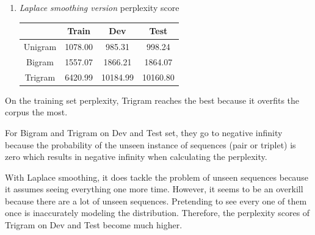 \documentclass{article}
\newenvironment{solution}{\color{blue}}{}
\begin{document}
\begin{enumerate}[(a)]
\begin{solution}
\begin{enumerate}[1.]
      \item \textit{Laplace smoothing version} perplexity score
      \begin{center}
        \begin{tabular}{| c | c | c | c |}
          \hline
          & Train & Dev & Test \\ \hline
          Unigram & 1078.00 & 985.31 & 998.24 \\ \hline
          Bigram & 1557.07 & 1866.21 & 1864.07 \\ \hline
          Trigram & 6420.99 & 10184.99 & 10160.80 \\ \hline
        \end{tabular}
      \end{center}
    \end{enumerate}

    On the training set perplexity, Trigram reaches the best because it overfits
    the corpus the most.

    For Bigram and Trigram on Dev and Test set, they go to negative infinity 
    because the probability of the unseen instance of sequences (pair or triplet)
    is zero which results in negative infinity when calculating the perplexity.

    With Laplace smoothing, it does tackle the problem of unseen sequences because 
    it assumes seeing everything one more time. However, it seems to be an overkill
    because there are a lot of unseen sequences. Pretending to see every one of them 
    once is inaccurately modeling the distribution. Therefore, the perplexity scores
    of Trigram on Dev and Test become much higher.
  \end{solution}
\end{enumerate}
\end{document}
